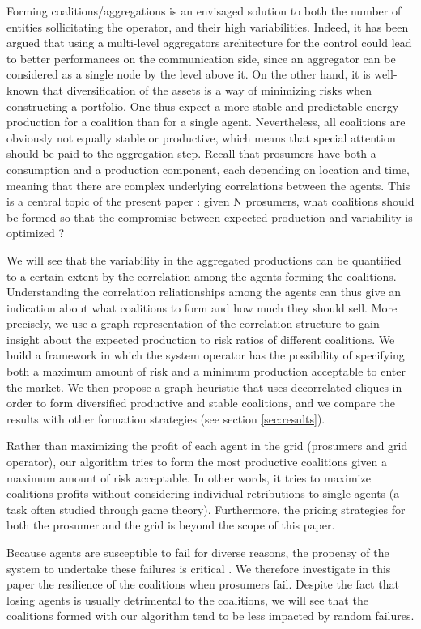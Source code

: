 \documentclass[conference]{IEEEtran}
\begin{document}
Forming coalitions/aggregations is an envisaged solution to both the number of entities sollicitating the operator, and their high variabilities. Indeed, it has been argued that using a multi-level aggregators architecture for the control could lead to better performances on the communication side, since an aggregator can be considered as a single node by the level above it. On the other hand, it is well-known that diversification of the assets is a way of minimizing risks when constructing a portfolio. One thus expect a more stable and predictable energy production for a coalition than for a single agent. Nevertheless, all coalitions are obviously not equally stable or productive, which means that special attention should be paid to the aggregation step. Recall that prosumers have both a consumption and a production component, each depending on location and time, meaning that there are complex underlying correlations between the agents. This is a central topic of the present paper : given N prosumers, what coalitions should be formed so that the compromise between expected production and variability is optimized ?

We will see that the variability in the aggregated productions can be quantified to a certain extent by the correlation among the agents forming the coalitions. Understanding the correlation reliationships among the agents can thus give an indication about what coalitions to form and how much they should sell. More precisely, we use a graph representation of the correlation structure to gain insight about the expected production to risk ratios of different coalitions. We build a framework in which the system operator has the possibility of specifying both a maximum amount of risk and a minimum production acceptable to enter the market. We then propose a graph heuristic that uses decorrelated cliques in order to form diversified productive and stable coalitions, and we compare the results with other formation strategies (see section \ref{sec:results}). 

Rather than maximizing the profit of each agent in the grid (prosumers and grid operator), our algorithm tries to form the most productive coalitions given a maximum amount of risk acceptable. In other words, it tries to maximize coalitions profits without considering individual retributions to single agents (a task often studied through game theory). Furthermore, the pricing strategies for both the prosumer and the grid is beyond the scope of this paper.  

Because agents are susceptible to fail for diverse reasons, the propensy of the system to undertake these failures is critical \cite{Pahwa}. We therefore investigate in this paper the resilience of the coalitions when prosumers fail. Despite the fact that losing agents is usually detrimental to the coalitions, we will see that the coalitions formed with our algorithm tend to be less impacted by random failures.
\end{document}
